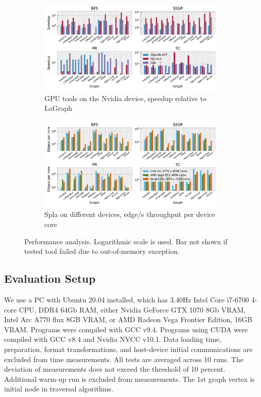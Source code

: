 \begin{figure}[h]
    \centering
    \begin{subfigure}[b]{0.48\textwidth}
        \includegraphics[width=1.0\linewidth]{plots/rq1_rel.pdf}
        \caption{GPU tools on the Nvidia device, speedup relative to LaGraph}
        \label{fig:rq1_chart}
    \end{subfigure}
    \begin{subfigure}[b]{0.48\textwidth}
        \includegraphics[width=1.0\linewidth]{plots/rq2_cores.pdf}
        \caption{Spla on different devices, edge/s throughput per device core}
        \label{fig:rq2_chart}
    \end{subfigure}
    \caption{Performance analysis. Logarithmic scale is used. Bar not shown if tested tool failed due to out-of-memory exception.}
\end{figure}
        
\subsection{Evaluation Setup}

We use a PC with Ubuntu 20.04 installed, which has 3.40Hz Intel Core i7-6700 4-core CPU, DDR4 64Gb RAM, either Nvidia GeForce GTX 1070 8Gb VRAM, Intel Arc A770 flux 8GB VRAM, or AMD Radeon Vega Frontier Edition, 16GB VRAM. Programs were compiled with GCC v9.4. Programs using CUDA were compiled with GCC v8.4 and Nvidia NVCC v10.1.
Data loading time, preparation, format transformations, and host-device initial communications are excluded from time measurements. 
All tests are averaged across 10 runs. 
The deviation of measurements does not exceed the threshold of 10 percent. 
Additional warm-up run is excluded from measurements. 
The 1st graph vertex is initial node in traversal algorithms.

